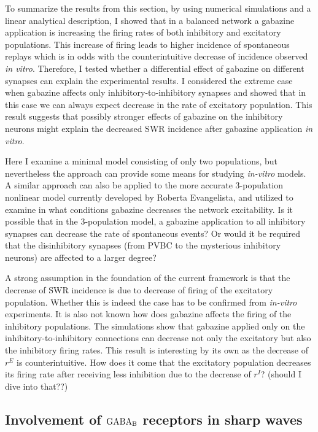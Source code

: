     To summarize the results from this section, by using numerical simulations
    and a linear analytical description, I showed that in a balanced network a
    gabazine application is increasing the firing rates of both inhibitory and
    excitatory populations. This increase of firing leads to higher incidence
    of spontaneous replays which is in odds with the counterintuitive decrease
    of incidence observed {\textit {in vitro}}. Therefore, I tested whether a
    differential effect of gabazine on different synapses can explain the
    experimental results. I considered the extreme case when gabazine affects
    only inhibitory-to-inhibitory synapses and showed that in this case we can
    always expect decrease in the rate of excitatory population. This result
    suggests that possibly stronger effects of gabazine on the inhibitory
    neurons might explain the decreased SWR incidence after gabazine
    application {\textit {in vitro}}.
    
    Here I examine a minimal model consisting of only two populations, but
    nevertheless the approach can provide some means for studying {\it in-vitro}
    models. A similar approach can also be applied to the more accurate
    3-population nonlinear model currently developed by Roberta Evangelista,
    and utilized to examine in what conditions gabazine decreases the network
    excitability. Is it possible that in the 3-population model, a gabazine
    application to all inhibitory synapses can decrease the rate of spontaneous
    events? Or would it be required that the disinhibitory synapses (from PVBC
    to the mysterious inhibitory neurons) are affected to a larger degree?

    A strong assumption in the foundation of the current framework is that the
    decrease of SWR incidence is due to decrease of firing of the excitatory
    population. Whether this is indeed the case has to be confirmed from
    {\it in-vitro} experiments. It is also not known how does gabazine affects the
    firing of the inhibitory populations. The simulations show that gabazine
    applied only on the inhibitory-to-inhibitory connections can decrease not
    only the excitatory but also the inhibitory firing rates. This result is
    interesting by its own as the decrease of $r^E$ is counterintuitive. How
    does it come that the excitatory population decreases its firing rate after
    receiving less inhibition due to the decrease of $r^I$? (should I dive into that??)

  \subsection{Involvement of $\rm GABA_B$ receptors in sharp waves}


